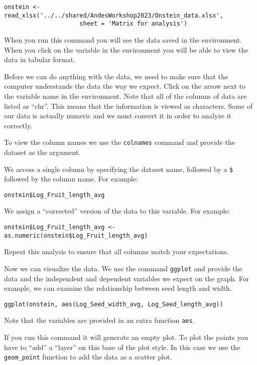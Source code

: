 \documentclass[
]{book}
\begin{document}
\begin{verbatim}
onstein <- read_xlsx('../../shared/AndesWorkshop2023/Onstein_data.xlsx',
                     sheet = 'Matrix for analysis')
\end{verbatim}

When you run this command you will see the data saved in the environment.
When you click on the variable in the environment you will be able to view the data in tabular format.

Before we can do anything with the data, we need to make sure that the computer understands
the data the way we expect.
Click on the arrow next to the variable name in the environment.
Note that all of the columns of data are listed as ``chr''.
This means that the information is viewed as characters.
Some of our data is actually numeric and we must convert it in order to analyze it correctly.

To view the column names we use the \texttt{colnames} command and provide the dataset as the argument.

We access a single column by specifying the dataset name, followed by a \texttt{\$} followed by the column name. For example:

\begin{verbatim}
onstein$Log_Fruit_length_avg
\end{verbatim}

We assign a ``corrected'' version of the data to this variable.
For example:

\begin{verbatim}
onstein$Log_Fruit_length_avg <- as.numeric(onstein$Log_Fruit_length_avg)
\end{verbatim}

Repeat this analysis to ensure that all columns match your expectations.

Now we can visualize the data.
We use the command \texttt{ggplot} and provide the data and the independent and dependent variables we expect on the graph.
For example, we can examine the relationship between seed length and width.

\begin{verbatim}
ggplot(onstein, aes(Log_Seed_width_avg, Log_Seed_length_avg))
\end{verbatim}

Note that the variables are provided in an extra function \texttt{aes}.

If you run this command it will generate an empty plot. To plot the points you have to ``add'' a ``layer'' on this base of the plot style. In this case we use the \texttt{geom\_point} function to add the data as a scatter plot.
\end{document}
